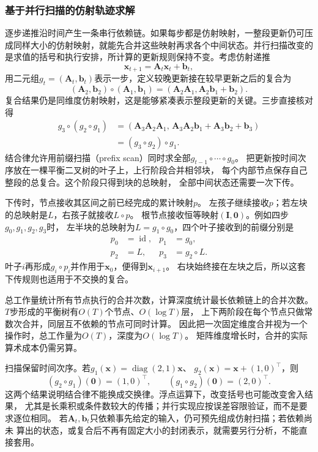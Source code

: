 \subsubsection{基于并行扫描的仿射轨迹求解}
逐步递推沿时间产生一条串行依赖链。如果每步都是仿射映射，一整段更新仍可压成同样大小的仿射映射，就能先合并这些映射再求各个中间状态。并行扫描改变的是求值的括号和执行安排，所计算的更新规则保持不变。考虑仿射递推
\begin{equation}
  \bm x_{t+1}=\bm A_t\bm x_t+\bm b_t,
  \label{eq:dynamical-affine-recurrence}
\end{equation}
用二元组$g_t=(\bm A_t,\bm b_t)$表示一步，定义较晚更新接在较早更新之后的复合为
\begin{equation}
  (\bm A_2,\bm b_2)\circ(\bm A_1,\bm b_1)
  =(\bm A_2\bm A_1,\bm A_2\bm b_1+\bm b_2).
  \label{eq:dynamical-affine-composition}
\end{equation}
复合结果仍是同维度仿射映射，这是能够紧凑表示整段更新的关键。三步直接核对得
\[
  \begin{aligned}
    g_3\circ(g_2\circ g_1)
    &=(\bm A_3\bm A_2\bm A_1,\,
       \bm A_3\bm A_2\bm b_1+\bm A_3\bm b_2+\bm b_3)\\
    &=(g_3\circ g_2)\circ g_1.
  \end{aligned}
\]
结合律允许用前缀扫描（prefix scan）同时求全部$g_{t-1}\circ\cdots\circ g_0$。
把更新按时间次序放在一棵平衡二叉树的叶子上，上行阶段合并相邻块，
每个内部节点保存自己整段的总复合。这个阶段只得到块的总映射，
全部中间状态还需要一次下传。

下传时，节点接收其区间之前已经完成的累计映射$p$。
左孩子继续接收$p$；若左块的总映射是$L$，右孩子就接收$L\circ p$。
根节点接收恒等映射$(\bm I,\bm0)$。例如四步$g_0,g_1,g_2,g_3$时，
左半块的总映射为$L=g_1\circ g_0$，四个叶子接收到的前缀分别是
\[
 \begin{aligned}
 p_0&=\operatorname{id},&p_1&=g_0,\\
 p_2&=L,&p_3&=g_2\circ L.
 \end{aligned}
\]
叶子$i$再形成$g_i\circ p_i$并作用于$\bm x_0$，便得到$\bm x_{i+1}$。
右块始终接在左块之后，所以这套下传规则也适用于不交换的复合。

总工作量统计所有节点执行的合并次数，计算深度统计最长依赖链上的合并次数。
$T$步形成的平衡树有$O(T)$个节点、$O(\log T)$层，
上下两阶段在每个节点只做常数次合并，同层互不依赖的节点可同时计算。
因此把一次固定维度合并视为一个操作时，总工作量为$O(T)$，深度为$O(\log T)$。
矩阵维度增长时，合并的实际算术成本仍需另算。

扫描保留时间次序。若$g_1(\bm x)=\operatorname{diag}(2,1)\bm x$、
$g_2(\bm x)=\bm x+(1,0)^\top$，则
\[
  (g_2\circ g_1)(\bm0)=(1,0)^\top,\qquad
  (g_1\circ g_2)(\bm0)=(2,0)^\top.
\]
这两个结果说明结合律不能换成交换律。浮点运算下，改变括号也可能改变舍入结果，
尤其是长乘积或条件数较大的传播；并行实现应按误差容限验证，而不是要求逐位相同。
若$\bm A_t,\bm b_t$只依赖事先给定的输入，仍可预先组成仿射扫描；若依赖尚未
算出的状态，或复合后不再有固定大小的封闭表示，就需要另行分析，不能直接套用。

